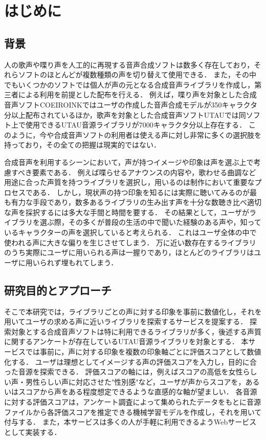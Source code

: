 \chapter{はじめに}
\thispagestyle{myheadings}

\section{背景}
人の歌声や喋り声を人工的に再現する音声合成ソフトは数多く存在しており，それらソフトのほとんどが複数種類の声を切り替えて使用できる．
また，その中でもいくつかのソフトでは個人が声の元となる合成音声ライブラリを作成し，第三者による利用を前提とした配布を行える．
例えば，喋り声を対象とした合成音声ソフトCOEIROINKではユーザの作成した音声合成モデルが350キャラクタ分以上配布されているほか\cite{mycoeiroink}，歌声を対象とした合成音声ソフトUTAUでは同ソフト上で使用できるUTAU音源ライブラリが7000キャラクタ分以上存在する\cite{vdbutau}．
このように，今や合成音声ソフトの利用者は使える声に対し非常に多くの選択肢を持っており，その全ての把握は現実的ではない．

合成音声を利用するシーンにおいて，声が持つイメージや印象は声を選ぶ上で考慮すべき要素である．
例えば喋らせるアナウンスの内容や，歌わせる曲調など用途に合った声質を持つライブラリを選択し，用いるのは制作において重要なプロセスである．
しかし，現状声の持つ印象を知るには実際に聴いてみるのが最も有力な手段であり，数多あるライブラリの生み出す声を十分な数聴き比べ適切な声を採択するには多大な手間と時間を要する．
その結果として，ユーザがライブラリを選ぶ際，その多くが普段の生活の中で聞いた経験のある声や，知っているキャラクターの声を選択していると考えられる．
これはユーザ全体の中で使われる声に大きな偏りを生じさせてしまう．
万に近い数存在するライブラリのうち実際にユーザに用いられる声は一握りであり，ほとんどのライブラリはユーザに用いられず埋もれてしまう．

\section{研究目的とアプローチ}
そこで本研究では，ライブラリごとの声に対する印象を事前に数値化し，それを用いてユーザの求める声に近いライブラリを探索するサービスを提案する．
探索対象とする合成音声ソフトは特に利用できるライブラリが多く，後述する声質に関するアンケートが存在しているUTAU音源ライブラリを対象とする．
本サービスでは事前に，声に対する印象を複数の印象軸ごとに評価スコアとして数値化する．
ユーザは理想としてイメージする声の評価スコアを入力し，目的に合った音源を探索できる．
評価スコアの軸には，例えばスコアの高低を女性らしい声・男性らしい声に対応させた"性別感"など，ユーザが声からスコアを，あるいはスコアから声をある程度想定できるような直感的な軸が望ましい．
各音源に対する評価スコアは，アンケート調査によって集められたデータをもとに音源ファイルから各評価スコアを推定できる機械学習モデルを作成し，それを用いて付与する．
また，本サービスは多くの人が手軽に利用できるようWebサービスとして実装する．

